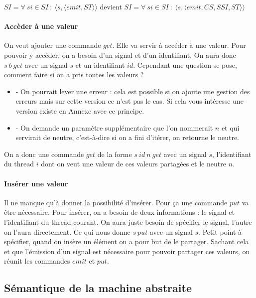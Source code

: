 \documentclass[10pt,a4paper]{report}
\begin{document}
	$SI = \forall~si \in SI~:~\langle s,\langle emit,ST \rangle\rangle$ devient $SI = \forall~si \in SI~:~\langle s,\langle emit,CS,SSI,ST \rangle\rangle$
	\bigbreak
	
	
	\paragraph{Accèder à une valeur}
	
	On veut ajouter une commande $get$. Elle va servir à accéder à une valeur. Pour pouvoir y accéder, on a besoin d'un signal et d'un identifiant. On aura donc $s~b~get$ avec un signal $s$ et un identifiant $id$. Cependant une question se pose, comment faire si on a pris toutes les valeurs ? 
	\smallbreak
	\begin{itemize}
		\item[] - On pourrait lever une erreur : cela est possible si on ajoute une gestion des erreurs mais sur cette version ce n'est pas le cas. Si cela vous intéresse une version existe en Annexe avec ce principe.
		\item[] - On demande un paramètre supplémentaire que l'on nommerait $n$ et qui servirait de neutre, c'est-à-dire si on a fini d'itérer, on retourne le neutre.
	\end{itemize} 
	\smallbreak
	On a donc une commande $get$ de la forme $s~id~n~get$ avec un signal $s$, l'identifiant du thread $i$  dont on veut une valeur de ces valeurs partagées et le neutre $n$. 
	\bigbreak
	
	
	\paragraph{Insérer une valeur}
	
	Il ne manque qu'à donner la possibilité d'insérer. Pour ça une commande $put$ va être nécessaire. Pour insérer, on a besoin de deux informations : le signal et l'identifiant du thread courant. On aura juste besoin de spécifier le signal, l'autre on l'aura directement. Ce qui nous donne $s~put$ avec un signal $s$. 
	\smallbreak
	Petit point à spécifier, quand on insère un élément on a pour but de le partager. Sachant cela et que l'émission d'un signal est nécessaire pour pouvoir partager ces valeurs, on réunit les commandes $emit$ et $put$. 
	\bigbreak
	
	
	
	
	\subsection{Sémantique de la machine abstraite}
	
\end{document}
